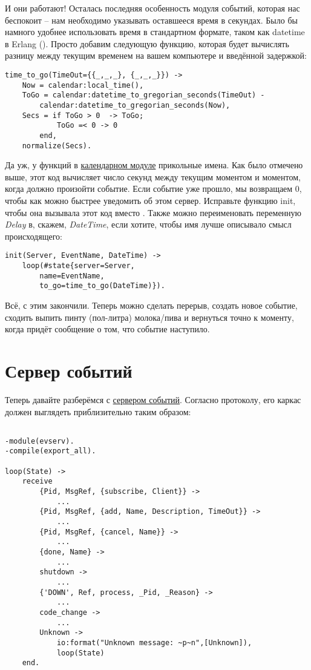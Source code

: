 И они работают!
Осталась последняя особенность модуля событий, которая нас беспокоит \--- нам необходимо указывать оставшееся время в секундах.
Было бы намного удобнее использовать время в стандартном формате, таком как datetime в Erlang ().
Просто добавим следующую функцию, которая будет вычислять разницу между текущим временем на вашем компьютере и введённой задержкой:
\begin{lstlisting}[style=erlang]
time_to_go(TimeOut={{_,_,_}, {_,_,_}}) ->
    Now = calendar:local_time(),
    ToGo = calendar:datetime_to_gregorian_seconds(TimeOut) -
        calendar:datetime_to_gregorian_seconds(Now),
    Secs = if ToGo > 0  -> ToGo;
            ToGo =< 0 -> 0
        end,
    normalize(Secs).
\end{lstlisting}

Да уж, у функций в \href{http://erldocs.com/R15B/stdlib/calendar.html}{календарном модуле} прикольные имена.
Как было отмечено выше, этот код вычисляет число секунд между текущим моментом и моментом, когда должно произойти событие.
Если событие уже прошло, мы возвращаем 0, чтобы как можно быстрее уведомить об этом сервер.
Исправьте функцию init, чтобы она вызывала этот код вместо .
Также можно переименовать переменную \emph{Delay} в, скажем, \emph{DateTime}, если хотите, чтобы имя лучше описывало смысл происходящего:
\begin{lstlisting}[style=erlang]
init(Server, EventName, DateTime) ->
    loop(#state{server=Server,
        name=EventName,
        to_go=time_to_go(DateTime)}).
\end{lstlisting}

Всё, с этим закончили.
Теперь можно сделать перерыв, создать новое событие, сходить выпить пинту (пол\--литра) молока/пива и вернуться точно к моменту, когда придёт сообщение о том, что событие наступило.
\section{Сервер событий}
\label{the-event-server}
Теперь давайте разберёмся с \href{http://learnyousomeerlang.com/static/erlang/evserv.erl}{сервером событий}.
Согласно протоколу, его каркас должен выглядеть приблизительно таким образом:
\begin{lstlisting}[style=erlang]

-module(evserv).
-compile(export_all).
 
loop(State) ->
    receive
        {Pid, MsgRef, {subscribe, Client}} ->
            ...
        {Pid, MsgRef, {add, Name, Description, TimeOut}} ->
            ...
        {Pid, MsgRef, {cancel, Name}} ->
            ...
        {done, Name} ->
            ...
        shutdown ->
            ...
        {'DOWN', Ref, process, _Pid, _Reason} ->
            ...
        code_change ->
            ...
        Unknown ->
            io:format("Unknown message: ~p~n",[Unknown]),
            loop(State)
    end.
\end{lstlisting}


